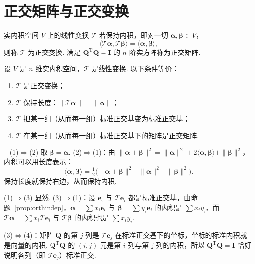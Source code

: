 \documentclass[lang=cn,10.5pt,scheme=chinese,toc=twocol,section,chinesefont=nofont,
twoside,citestyle=gb7714-2015,bibstyle=gb7714-2015]{elegantbook}
\DeclareRobustCommand{\textbf}[1]{{\lnsemiboldlatin\lnsemiboldcjk #1}}
\newcommand{\vv}[1]{\boldsymbol{#1}}
\newcommand{\trans}{\mathrm{T}}             %
\numberwithin{equation}{section}   %
\newcommand*{\lnlabel}[1]{{\sffamily\bfseries\color{black}#1}}
\renewenvironment{proof}{%
	\par\noindent\lnlabel{\proofname}\;\ \color{black!90}\cfs}{\par}
\begin{document}
\section{正交矩阵与正交变换}\label{sec:orthogonal}

\begin{definition}
  实内积空间 $V$ 上的线性变换 $\mathscr T$ 若保持内积，即对一切 $\vv\alpha,\vv\beta\in V$，
  \[\langle\mathscr T\vv\alpha,\mathscr T\vv\beta\rangle=\langle\vv\alpha,\vv\beta\rangle,\]
  则称 $\mathscr T$ 为\textbf{正交变换}. 满足 $\vv Q^\trans\vv Q=\vv I$ 的 $n$ 阶实方阵称为\textbf{正交矩阵}.
\end{definition}

\begin{theorem}
  \label{thm:orthequiv}
  设 $V$ 是 $n$ 维实内积空间，$\mathscr T$ 是线性变换. 以下条件等价：
  \begin{enumerate}
    \item $\mathscr T$ 是正交变换；
    \item $\mathscr T$ 保持长度：$\|\mathscr T\vv\alpha\|=\|\vv\alpha\|$；
    \item $\mathscr T$ 把某一组（从而每一组）标准正交基变为标准正交基；
    \item $\mathscr T$ 在某一组（从而每一组）标准正交基下的矩阵是正交矩阵.
  \end{enumerate}
\end{theorem}
\begin{proof}
  (1)$\Rightarrow$(2) 取 $\vv\beta=\vv\alpha$. (2)$\Rightarrow$(1)：由 $\|\vv\alpha+\vv\beta\|^2=\|\vv\alpha\|^2+2\langle\vv\alpha,\vv\beta\rangle+\|\vv\beta\|^2$，内积可以用长度表示：
  \[\langle\vv\alpha,\vv\beta\rangle=\tfrac12\big(\|\vv\alpha+\vv\beta\|^2-\|\vv\alpha\|^2-\|\vv\beta\|^2\big).\]
  保持长度就保持右边，从而保持内积.

  (1)$\Rightarrow$(3) 显然. (3)$\Rightarrow$(1)：设 $\vv e_i$ 与 $\mathscr T\vv e_i$ 都是标准正交基，由命题~\ref{prop:orthindep}，$\vv\alpha=\sum x_i\vv e_i$ 与 $\vv\beta=\sum y_i\vv e_i$ 的内积是 $\sum x_iy_i$，而 $\mathscr T\vv\alpha=\sum x_i\mathscr T\vv e_i$ 与 $\mathscr T\vv\beta$ 的内积也是 $\sum x_iy_i$.

  (3)$\Leftrightarrow$(4)：矩阵 $\vv Q$ 的第 $j$ 列是 $\mathscr T\vv e_j$ 在标准正交基下的坐标，坐标的标准内积就是向量的内积. $\vv Q^\trans\vv Q$ 的 $(i,j)$ 元是第 $i$ 列与第 $j$ 列的内积，所以 $\vv Q^\trans\vv Q=\vv I$ 恰好说明各列（即 $\mathscr T\vv e_j$）标准正交.
\end{proof}
\end{document}

